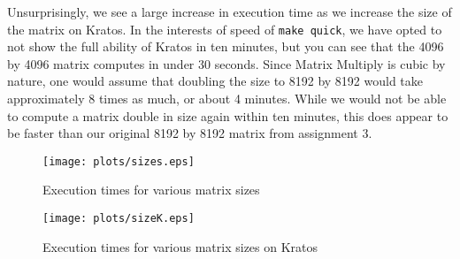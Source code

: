 \documentclass[twocolumn]{article}
\begin{document}
Unsurprisingly, we see a large increase in execution time as we increase the size
of the matrix on Kratos. In the interests of speed of \texttt{make quick}, we have
opted to not show the full ability of Kratos in ten minutes, but you can see that 
the 4096 by 4096 matrix computes in under 30 seconds. Since Matrix Multiply is 
cubic by nature, one would assume that doubling the size to 8192 by 8192 would 
take approximately 8 times as much, or about 4 minutes. While we would not be able
to compute a matrix double in size again within ten minutes, this does appear to 
be faster than our original 8192 by 8192 matrix from assignment 3.

\begin{figure}
  \texttt{[image: plots/sizes.eps]}
  \caption{Execution times for various matrix sizes} \label{fig:time}
\end{figure}

\begin{figure}
  \texttt{[image: plots/sizeK.eps]}
  \caption{Execution times for various matrix sizes on Kratos}
\end{figure}
\end{document}
